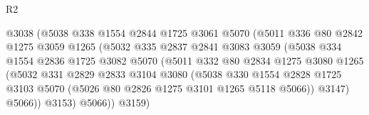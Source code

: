 \begin{lexlean}{R2}
\begin{coremodule}
                                  @3038
                                  (@5038
                                    @338
                                    @1554
                                    @2844
                                    @1725
                                    @3061
                                    @5070
                                    (@5011
                                      @336
                                      @80
                                      @2842
                                      @1275
                                      @3059
                                      @1265
                                      (@5032
                                        @335
                                        @2837
                                        @2841
                                        @3083
                                        @3059
                                        (@5038
                                          @334
                                          @1554
                                          @2836
                                          @1725
                                          @3082
                                          @5070
                                          (@5011
                                            @332
                                            @80
                                            @2834
                                            @1275
                                            @3080
                                            @1265
                                            (@5032
                                              @331
                                              @2829
                                              @2833
                                              @3104
                                              @3080
                                              (@5038
                                                @330
                                                @1554
                                                @2828
                                                @1725
                                                @3103
                                                @5070
                                                (@5026 @80 @2826 @1275 @3101 @1265 @5118 @5066))
                                              @3147)
                                            @5066))
                                        @3153)
                                      @5066))
                                  @3159)

\end{coremodule}
\end{lexlean}
